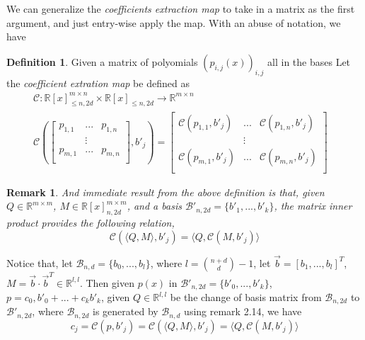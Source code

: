 \documentclass[12pt]{amsart}
\numberwithin{equation}{section}
\newtheorem{remark}[thm]{Remark}
\theoremstyle{definition}
\newtheorem{definition}[thm]{Definition}
\numberwithin{thm}{section}
\begin{document}
\smallskip 
We can generalize the \emph{coefficients extraction map} to take in a matrix as the first argument, and just entry-wise apply the map. With an abuse of notation, we have 
\begin{definition}
     Given a matrix of polyomials $(p_{i, j}(x))_{i, j}$ all in the bases Let the \emph{coefficient extration map} be defined as 
     \begin{equation}
          \begin{split}
               \mathcal{C}: \mathbb{R}[x]_{\leq n, 2d}^{m \times n} \times \mathbb{R}[x]_{\leq n, 2d} \rightarrow \mathbb{R}^{m \times n} & \\
               \mathcal{C}(
                    \begin{bmatrix} 
                         p_{1, 1} & ... & p_{1, n} \\
                         & \vdots \\
                         p_{m, 1} & ... & p_{m, n} \\
                    \end{bmatrix}, b'_j
               ) = \begin{bmatrix} 
                    \mathcal{C}(p_{1, 1}, b'_j) & ... &  \mathcal{C}(p_{1, n}, b'_j) \\
                    & \vdots \\
                    \mathcal{C}(p_{m, 1}, b'_j) & ... &  \mathcal{C}(p_{m, n}, b'_j) \\
                    \end{bmatrix}
          \end{split}
     \end{equation}
\end{definition}

\begin{remark}
     And immediate result from the above definition is that, given $Q \in \mathbb{R}^{m \times m}$, $M \in \mathbb{R}[x]_{n, 2d}^{m \times m}$, 
     and a basis $\mathcal{B}'_{n, 2d} = \{b'_1, ..., b'_k\}$, the matrix inner product provides the following relation,
     \begin{equation}
          \mathcal{C}(\langle Q, M \rangle, b'_j) = \langle Q, \mathcal{C}(M, b'_j) \rangle
     \end{equation}
\end{remark}

\smallskip
Notice that, let $\mathcal{B}_{n, d} = \{b_0,...,b_l\}$, where $l = {n + d \choose d} - 1$, 
let $\vec{b} = [b_1, ..., b_l]^T$, $M = \vec{b} \cdot \vec{b}^T \in \mathbb{R}^{l, l}$. 
Then given $p(x)$ in $\mathcal{B}'_{n, 2d} = \{b'_0, ..., b'_k\}$, $p = c_0,b'_0 + ... + c_k b'_k$, 
given $Q \in \mathbb{R}^{l, l}$ be the change of basis matrix from $\mathcal{B}_{n, 2d}$ to $\mathcal{B}'_{n, 2d}$, 
where $\mathcal{B}_{n, 2d}$ is generated by $\mathcal{B}_{n, d}$ using remark 2.14, we have
\begin{equation}
     c_j = \mathcal{C}(p, b'_j) = \mathcal{C}(\langle Q, M \rangle, b'_j ) = \langle Q, \mathcal{C}(M, b'_j) \rangle
\end{equation}
\end{document}

